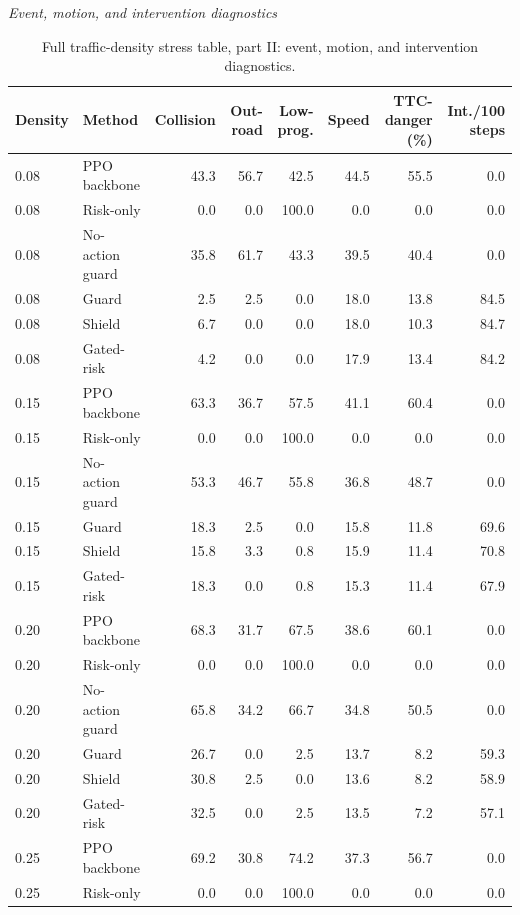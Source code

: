 \begin{table}[!htbp]
\centering
\caption{Full traffic-density stress table, part II: event, motion, and intervention diagnostics.}
\label{tab_density_diagnostics}
\tiny
\setlength{\tabcolsep}{3.2pt}
\renewcommand{\arraystretch}{1.04}
\textit{Event, motion, and intervention diagnostics}\par
\begin{tabular}{@{}llrrrrrr@{}}
\toprule
Density & Method & Collision & Out-road & Low-prog. & Speed & TTC-danger (\%) & Int./100 steps \\
\midrule
0.08 & PPO backbone & 43.3 & 56.7 & 42.5 & 44.5 & 55.5 & 0.0 \\
0.08 & Risk-only & 0.0 & 0.0 & 100.0 & 0.0 & 0.0 & 0.0 \\
0.08 & No-action guard & 35.8 & 61.7 & 43.3 & 39.5 & 40.4 & 0.0 \\
0.08 & Guard & 2.5 & 2.5 & 0.0 & 18.0 & 13.8 & 84.5 \\
0.08 & Shield & 6.7 & 0.0 & 0.0 & 18.0 & 10.3 & 84.7 \\
0.08 & Gated-risk & 4.2 & 0.0 & 0.0 & 17.9 & 13.4 & 84.2 \\
0.15 & PPO backbone & 63.3 & 36.7 & 57.5 & 41.1 & 60.4 & 0.0 \\
0.15 & Risk-only & 0.0 & 0.0 & 100.0 & 0.0 & 0.0 & 0.0 \\
0.15 & No-action guard & 53.3 & 46.7 & 55.8 & 36.8 & 48.7 & 0.0 \\
0.15 & Guard & 18.3 & 2.5 & 0.0 & 15.8 & 11.8 & 69.6 \\
0.15 & Shield & 15.8 & 3.3 & 0.8 & 15.9 & 11.4 & 70.8 \\
0.15 & Gated-risk & 18.3 & 0.0 & 0.8 & 15.3 & 11.4 & 67.9 \\
0.20 & PPO backbone & 68.3 & 31.7 & 67.5 & 38.6 & 60.1 & 0.0 \\
0.20 & Risk-only & 0.0 & 0.0 & 100.0 & 0.0 & 0.0 & 0.0 \\
0.20 & No-action guard & 65.8 & 34.2 & 66.7 & 34.8 & 50.5 & 0.0 \\
0.20 & Guard & 26.7 & 0.0 & 2.5 & 13.7 & 8.2 & 59.3 \\
0.20 & Shield & 30.8 & 2.5 & 0.0 & 13.6 & 8.2 & 58.9 \\
0.20 & Gated-risk & 32.5 & 0.0 & 2.5 & 13.5 & 7.2 & 57.1 \\
0.25 & PPO backbone & 69.2 & 30.8 & 74.2 & 37.3 & 56.7 & 0.0 \\
0.25 & Risk-only & 0.0 & 0.0 & 100.0 & 0.0 & 0.0 & 0.0 \\

\end{tabular}
\end{table}
